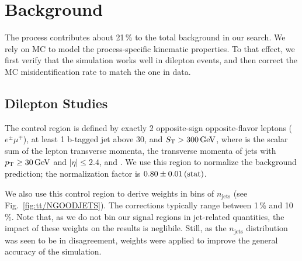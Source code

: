\section{\texorpdfstring{\ttbar}{TTbar} Background}
\label{sec:bkg_tt}

The \ttbar process contributes about 21\,\% to the total background in our search. We rely on MC to model the process-specific kinematic properties. To that effect, we first verify that the simulation works well in dilepton events, and then correct the MC misidentification rate to match the one in data.

\subsection{Dilepton Studies}
The \ttbar control region is defined by exactly 2 opposite-sign opposite-flavor leptons ($e^\pm \mu^\mp$), at least 1 b-tagged jet above 30\GeV, and $S_{\mathrm{T}} > 300\,\text{Ge\hspace{-.08em}V}$, where \ST is the scalar sum of the lepton transverse momenta, the transverse momenta of jets with $p_{\mathrm{T}} \geq 30\,\text{Ge\hspace{-.08em}V}$ and $|\eta| \leq 2.4$, and \MET. We use this region to normalize the background prediction; the normalization factor is $0.80 \pm 0.01\,\text{(stat)}$.

We also use this control region to derive weights in bins of $n_\textrm{jets}$ (see Fig.~\ref{fig:tt/NGOODJETS}). The corrections typically range between 1\,\% and 10\,\%. Note that, as we do not bin our signal regions in jet-related quantities, the impact of these weights on the results is neglibile. Still, as the $n_\textrm{jets}$ distribution was seen to be in disagreement, weights were applied to improve the general accuracy of the simulation.

